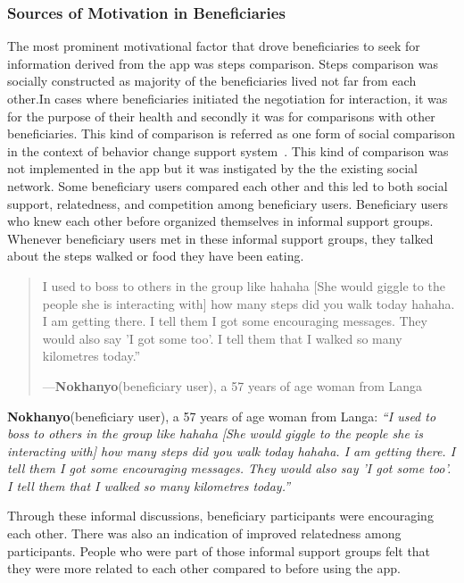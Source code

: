 \documentclass{sig-alternate}
\newcommand{\userquote}[2]{\begin{quote}
     \em{\small{#2 \begin{flushright}---#1\end{flushright}}}
   \end{quote}}
\begin{document}
\subsubsection*{\textbf{Sources of Motivation in Beneficiaries}}

The most prominent motivational factor that drove beneficiaries to seek for
information derived from the app was steps comparison. Steps comparison was
socially constructed as majority of the beneficiaries lived not far from each
other.In cases where beneficiaries initiated the negotiation for interaction,
it was for the purpose of their health and secondly it was for comparisons
with other beneficiaries. This kind of comparison is referred as one form of
social comparison in the context of behavior change support 
system~\cite{Oinas-kukkonen:psd}. This kind of comparison 
was not implemented in the app but it
was instigated by the the existing social network. Some beneficiary users
compared each other and this led to both social support, relatedness, and
competition among beneficiary users. Beneficiary users who knew each other
before organized themselves in informal support groups. Whenever beneficiary
users met in these informal support groups, they talked about the steps walked
or food they have been eating.

\userquote{\textbf{Nokhanyo}(beneficiary user), a 57 years of age woman from Langa}
{I used to boss to others in the group like hahaha [She would giggle
 to the people she is interacting with] how many steps did you walk today 
 hahaha. I am getting there. I tell them I got some encouraging messages. 
 They would also say 'I got some too'. I tell them that I walked so many 
 kilometres today.''}


\textbf{Nokhanyo}(beneficiary user), a 57 years of age woman from Langa: 
\textit{``I used to boss to others in the group like hahaha [She would giggle
 to the people she is interacting with] how many steps did you walk today 
 hahaha. I am getting there. I tell them I got some encouraging messages. 
 They would also say 'I got some too'. I tell them that I walked so many 
 kilometres today.''}\newline\newline

Through these informal discussions, beneficiary participants were encouraging
each other. There was also an indication of improved relatedness among
participants. People who were part of those informal support groups felt that
they were more related to each other compared to before using the app.\newline\newline
\end{document}
